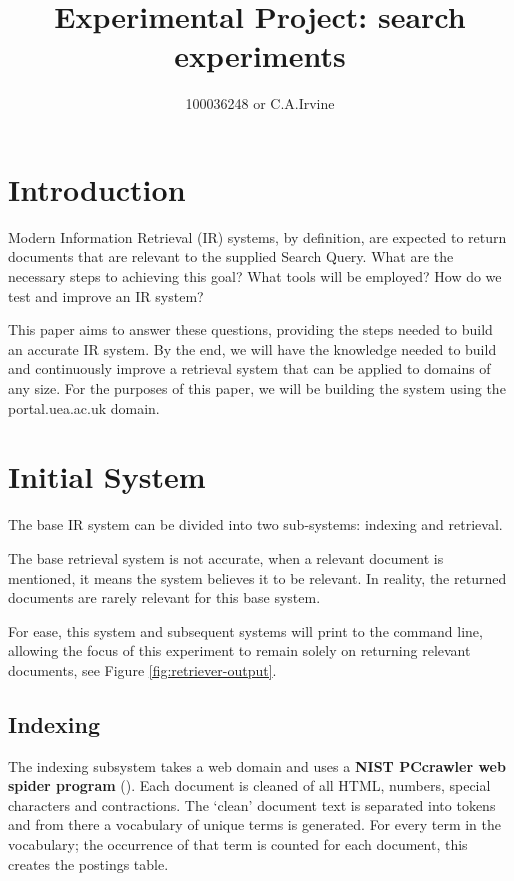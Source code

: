 \documentclass{sig-alternate}
\begin{document}
\title{Experimental Project: search experiments}
\author{
100036248 or C.A.Irvine
}
\maketitle
	\section{Introduction} \label{sec:intro}
	Modern Information Retrieval (IR) systems, by definition, are expected to return documents that are relevant to the supplied Search Query. What are the necessary steps to achieving this goal? What tools will be employed? How do we test and improve an IR system?
	
	This paper aims to answer these questions, providing the steps needed to build an accurate IR system. By the end, we will have the knowledge needed to build and continuously improve a retrieval system that can be applied to domains of any size. For the purposes of this paper, we will be building the system using the portal.uea.ac.uk domain.
	
	\section{Initial System} \label{sec:base}
	The base IR system can be divided into two sub-systems: indexing and retrieval.
	
	The base retrieval system is not accurate, when a relevant document is mentioned, it means the system believes it to be relevant. In reality, the returned documents are rarely relevant for this base system.
	
	For ease, this system and subsequent systems will print to the command line, allowing the focus of this experiment to remain solely on returning relevant documents, see Figure \ref{fig:retriever-output}.
	
		\subsection{Indexing} \label{sec:base-index}
		The indexing subsystem takes a web domain and uses a \textbf{NIST PCcrawler web spider program} (\cite{NIST}). Each document is cleaned of all HTML, numbers, special characters and contractions. The `clean' document text is separated into tokens and from there a vocabulary of unique terms is generated. For every term in the vocabulary; the occurrence of that term is counted for each document, this creates the postings table.
		
\end{document}
